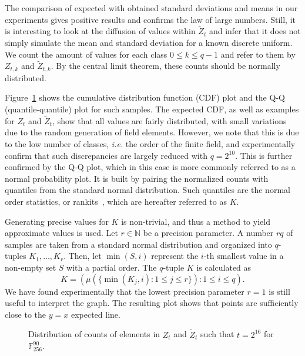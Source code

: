\documentclass[12pt, a4paper, oneside]{memoir}
\theoremstyle{definition}
\begin{document}
The comparison of expected with obtained standard deviations and means in our
experiments gives positive results and confirms the law of large numbers.
Still, it is interesting to look at the diffusion of values within
$\widetilde{Z}_{t}$ and infer that it does not simply simulate the mean and
standard deviation for a known discrete uniform. We count the amount of values
for each class $0 \leq k \leq q - 1$ and refer to them by $Z_{t, k}$ and
$\widetilde{Z}_{t, k}$. By the central limit theorem, these counts should be
normally distributed.

Figure~\ref{fig:3} shows the cumulative distribution function (CDF) plot and
the Q-Q (quantile-quantile) plot for such samples. The expected CDF, as well as
examples for $Z_{t}$ and $\widetilde{Z}_{t}$, show that all values are fairly
distributed, with small variations due to the random generation of field
elements. However, we note that this is due to the low number of classes,
\emph{i.e.} the order of the finite field, and experimentally confirm that such
discrepancies are largely reduced with $q = 2^{10}$. This is further confirmed
by the Q-Q plot, which in this case is more commonly referred to as a normal probability plot. It is built by pairing the normalized counts with quantiles from the standard normal distribution. Such quantiles are the normal order statistics, or rankits~\cite{Ipsen:194405}, which are hereafter referred to as $K$. 

Generating precise values for $K$ is non-trivial, and thus a method to yield approximate values is used. Let $r \in \mathbb{N}$ be a precision parameter. A number $rq$ of samples are taken from a standard normal distribution and organized into $q$-tuples $K_{1}, \dots, K_{r}$. Then, let $\min(S, i)$ represent the $i$-th smallest value in a non-empty set $S$ with a partial order. The $q$-tuple $K$ is calculated as 
\[
    K = (\mu(\{\min(K_{j}, i) : 1 \leq j \leq r\}) : 1 \leq i \leq q).
\]
We have found experimentally that the lowest precision parameter $r = 1$ is still useful to interpret the graph. The resulting plot shows that points are sufficiently close to the $y = x$ expected line.

\begin{figure}[htbp]
  \caption{Distribution of counts of elements in $Z_{t}$ and
    $\widetilde{Z}_{t}$ such that $t = 2^{16}$ for
    $\mathbb{F}_{256}^{90}$.}\label{fig:3}
\end{figure}
\end{document}
